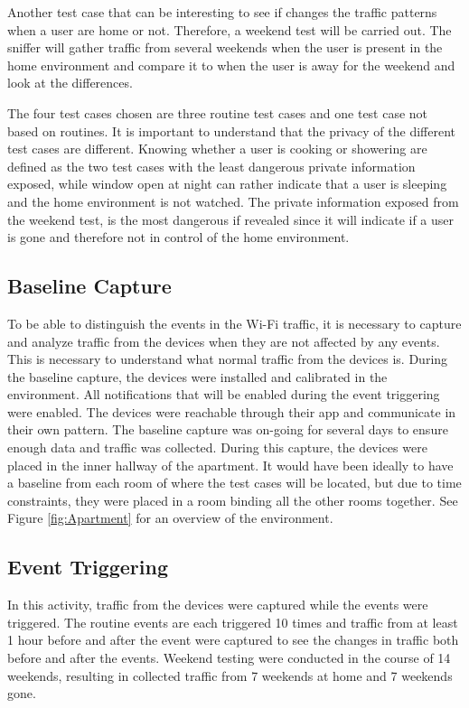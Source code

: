 Another test case that can be interesting to see if changes the traffic patterns when a user are home or not. Therefore, a weekend test will be carried out. The sniffer will gather traffic from several weekends when the user is present in the home environment and compare it to when the user is away for the weekend and look at the differences.

The four test cases chosen are three routine test cases and one test case not based on routines. It is important to understand that the privacy of the different test cases are different. Knowing whether a user is cooking or showering are defined as the two test cases with the least dangerous private information exposed, while window open at night can rather indicate that a user is sleeping and the home environment is not watched. The private information exposed from the weekend test, is the most dangerous if revealed since it will indicate if a user is gone and therefore not in control of the home environment.

\subsection{Baseline Capture}
To be able to distinguish the events in the \gls{Wi-Fi} traffic, it is necessary to capture and analyze traffic from the devices when they are not affected by any events. This is necessary to understand what normal traffic from the devices is. During the baseline capture, the devices were installed and calibrated in the environment. All notifications that will be enabled during the event triggering were enabled. The devices were reachable through their app and communicate in their own pattern. The baseline capture was on-going for several days to ensure enough data and traffic was collected. During this capture, the devices were placed in the inner hallway of the apartment. It would have been ideally to have a baseline from each room of where the test cases will be located, but due to time constraints, they were placed in a room binding all the other rooms together. See Figure \ref{fig:Apartment} for an overview of the environment.

\subsection{Event Triggering}
In this activity, traffic from the devices were captured while the events were triggered. The routine events are each triggered 10 times and traffic from at least 1 hour before and after the event were captured to see the changes in traffic both before and after the events. Weekend testing were conducted in the course of 14 weekends, resulting in collected traffic from 7 weekends at home and 7 weekends gone. 

